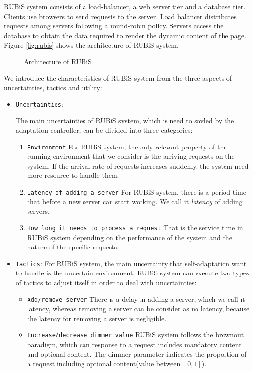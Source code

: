 \documentclass[sigconf]{acmart}
\begin{document}
RUBiS system consists of a load-balancer, a web server tier and a database tier. Clients use browsers to send requests to the server. Load balancer distributes requests among servers following a round-robin policy. Servers access the database to obtain the data required to render the dynamic content of the page.
Figure \ref{fig:rubis} shows the architecture of RUBiS system. 
\begin{figure}[h]
	\centering
	\caption{Architecture of RUBiS}
\end{figure}
We introduce the characteristics of RUBiS system from the three aspects of uncertainties, tactics and utility:
\begin{itemize}
	\item {\verb|Uncertainties|}:
	
	The main uncertainties of RUBiS system, which is need to sovled by the adaptation controller, can be divided into three categories:
	\begin{enumerate}
		\item {\verb|Environment|} For RUBiS system, the only relevant property of the running environment that we consider is the arriving requests on the system. If the arrival rate of requests increases suddenly, the system need more resource to handle them.
		\item {\verb|Latency of adding a server|} For RUBiS system, there is a period time that before a new server can start working. We call it \textit{latency} of adding servers. 
		\item {\verb|How long it needs to process a request|} That is the service time in RUBiS system depending on the performance of the system and the nature of the specific requests.
	\end{enumerate}
	\item {\verb|Tactics|}: 
	For RUBiS system, the main uncertainty that self-adaptation want to handle is the uncertain environment. RUBiS system can execute two types of tactics to adjust itself in order to deal with uncertainties:
	\begin{itemize}
		\item {\verb|Add/remove server|} There is a delay in adding a server, which we call it latency, whereas removing a server can be consider as no latency, because the latency for removing a server is negligible.
		\item  {\verb|Increase/decrease dimmer value|} RUBiS system follows the brownout paradigm\cite{brownout}, which can response to a request includes mandatory content and optional content. The dimmer parameter indicates the proportion of a request including optional content(value between $[0,1]$).

\end{itemize}
\end{itemize}
\end{document}

